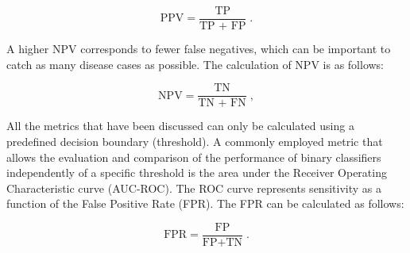 \begin{equation}
  \label{eq:ppv}
  \text{PPV} = \frac{\text{TP}}{\text{TP + FP}} \;.
\end{equation}

A higher NPV corresponds to fewer false negatives, which can be important to catch as many disease cases as possible.
The calculation of NPV is as follows:

\begin{equation}
  \label{eq:npv}
  \text{NPV} = \frac{\text{TN}}{\text{TN + FN}} \;,
\end{equation}

All the metrics that have been discussed can only be calculated using a predefined decision boundary (threshold).
A commonly employed metric that allows the evaluation and comparison of the performance of binary classifiers 
independently of a specific threshold is the area under the Receiver Operating Characteristic curve (AUC-ROC).
The ROC curve represents sensitivity as a function of the False Positive Rate (FPR).
The FPR can be calculated as follows:

\begin{equation}
  \label{eq:fpr}
  \text{FPR} = \frac{\text{FP}}{\text{FP} + \text{TN}} \;.
\end{equation}
